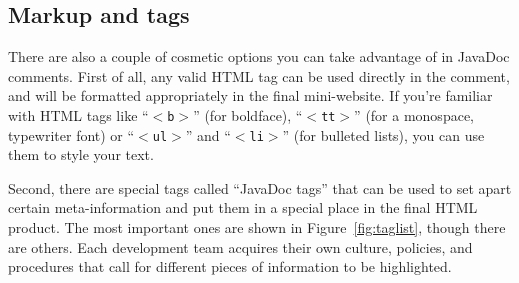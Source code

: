 \subsection{Markup and tags}

There are also a couple of cosmetic options you can take advantage of in
JavaDoc comments. First of all, any valid HTML tag can be used directly in the
comment, and will be formatted appropriately in the final mini-website. If
you're familiar with HTML tags like ``\texttt{$<$b$>$}'' (for boldface),
``\texttt{$<$tt$>$}'' (for a monospace, typewriter font) or
``\texttt{$<$ul$>$}'' and ``\texttt{$<$li$>$}'' (for bulleted lists), you can
use them to style your text.

Second, there are special tags called ``JavaDoc tags'' that can be used to set
apart certain meta-information and put them in a special place in the final
HTML product. The most important ones are shown in Figure~\ref{fig:taglist},
though there are others. Each development team acquires their own culture,
policies, and procedures that call for different pieces of information to be
highlighted.

\renewcommand\tabularxcolumn[1]{m{#1}}

